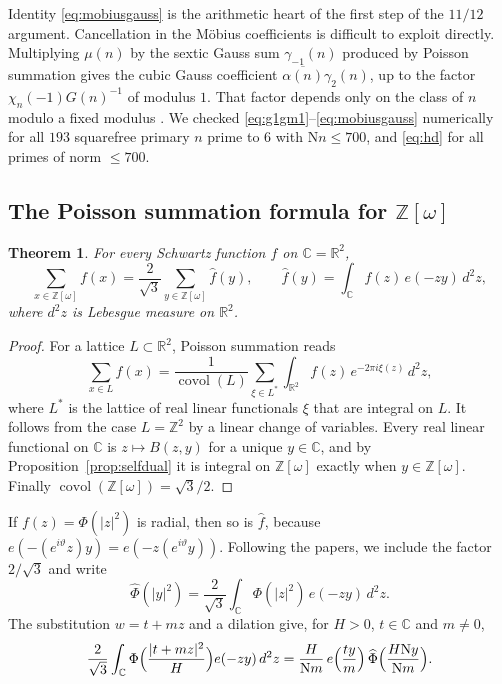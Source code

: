 \documentclass[11pt]{article}
\numberwithin{equation}{section}
\newcommand{\N}{\mathrm N}
\newcommand{\OO}{\mathbb Z[\omega]}
\newcommand{\Z}{\mathbb Z}
\newtheorem{theorem}{Theorem}
\theoremstyle{definition}
\theoremstyle{remark}
\begin{document}
Identity \eqref{eq:mobiusgauss} is the arithmetic heart of the first step of the $11/12$ argument.
Cancellation in the M\"obius coefficients is difficult to exploit directly. Multiplying $\mu(n)$ by the
sextic Gauss sum $\gamma_{-1}(n)$ produced by Poisson summation gives the cubic Gauss coefficient
$\overline{\alpha(n)}\gamma_2(n)$, up to the factor
$\chi_n(-1)G(n)^{-1}$ of modulus $1$. That factor depends only on the class of $n$ modulo a fixed modulus
\cite[Lemma~4.1]{QRH}. We checked \eqref{eq:g1gm1}--\eqref{eq:mobiusgauss} numerically for all $193$
squarefree primary $n$ prime to $6$ with $\N n\le700$, and \eqref{eq:hd} for all primes of norm $\le700$.

\subsection{The Poisson summation formula for \texorpdfstring{$\OO$}{Z[omega]}}\label{sec:poissonO}
\begin{theorem}\label{thm:poissonO}
For every Schwartz function $f$ on $\mathbb C=\mathbb R^2$,
\begin{equation}\label{eq:poissonO}
 \sum_{x\in\OO}f(x)=\frac2{\sqrt3}\sum_{y\in\OO}\widehat f(y),\qquad
 \widehat f(y)=\int_{\mathbb C}f(z)\,e(-zy)\,d^2z ,
\end{equation}
where $d^2z$ is Lebesgue measure on $\mathbb R^2$.
\end{theorem}

\begin{proof}
For a lattice $L\subset\mathbb R^2$, Poisson summation reads
\begin{equation}\label{eq:poissonL}
 \sum_{x\in L}f(x)=\frac1{\operatorname{covol}(L)}\sum_{\xi\in L^*}\int_{\mathbb R^2}f(z)\,e^{-2\pi i\xi(z)}\,d^2z ,
\end{equation}
where $L^*$ is the lattice of real linear functionals $\xi$ that are integral on $L$. It follows from the case
$L=\Z^2$ by a linear change of variables. Every real linear functional on $\mathbb C$ is $z\mapsto B(z,y)$ for a unique
$y\in\mathbb C$, and by Proposition~\ref{prop:selfdual} it is integral on $\OO$ exactly when $y\in\OO$. Finally
$\operatorname{covol}(\OO)=\sqrt3/2$.
\end{proof}

If $f(z)=\Phi(|z|^2)$ is radial, then so is $\widehat f$, because
$e(-(e^{i\vartheta}z)y)=e(-z(e^{i\vartheta}y))$. Following the papers, we include the factor $2/\sqrt3$ and write
\begin{equation}\label{eq:radialhat}
 \widehat\Phi(|y|^2)=\frac2{\sqrt3}\int_{\mathbb C}\Phi(|z|^2)\,e(-zy)\,d^2z .
\end{equation}
The substitution $w=t+mz$ and a dilation give, for $H>0$, $t\in\mathbb C$ and $m\ne0$,
\begin{equation}\label{eq:scaling}
 \frac2{\sqrt3}\int_{\mathbb C}\Phi\Bigl(\frac{|t+mz|^2}H\Bigr)e(-zy)\,d^2z
 =\frac H{\N m}\,e\Bigl(\frac{ty}m\Bigr)\,\widehat\Phi\Bigl(\frac{H\N y}{\N m}\Bigr).
\end{equation}
\end{document}
